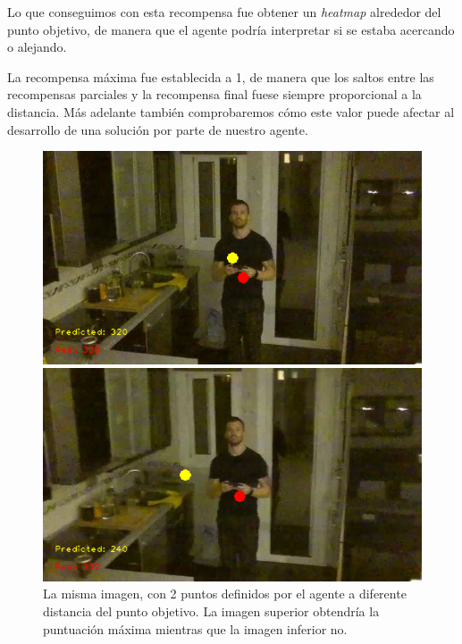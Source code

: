 Lo que conseguimos con esta recompensa fue obtener un \textit{heatmap} alrededor del punto objetivo, de manera que el agente podría interpretar si se estaba acercando o alejando. 
\medskip

La recompensa máxima fue establecida a 1, de manera que los saltos entre las recompensas parciales y la recompensa final fuese siempre proporcional a la distancia. Más adelante también comprobaremos cómo este valor puede afectar al desarrollo de una solución por parte de nuestro agente.
\medskip

\begin{figure}[ht!]
	\centering
	\parbox{5in}{
		\centering
		\includegraphics[scale=0.35]{figuras/recompensa/recompensa_maxima.png}
	}
	\qquad
	\begin{minipage}{5in}
		\centering
		\includegraphics[scale=0.35]{figuras/recompensa/recompensa_no_maxima.png}
	\end{minipage}
	\caption[Comparación de recompensa sobre la misma imagen dados dos puntos de vista distinto.]{La misma imagen, con 2 puntos definidos por el agente a diferente distancia del punto objetivo. La imagen superior obtendría la puntuación máxima mientras que la imagen inferior no.}%
	\label{fig-recompensa-imagenes}
\end{figure}


